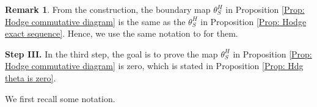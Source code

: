 \documentclass[11pt, a4paper]{amsart}
\theoremstyle{plain}
\theoremstyle{definition}
\newtheorem{remark}[theorem]{Remark}
\numberwithin{equation}{section}
\begin{document}
\begin{remark}
    From the construction, the boundary map $\theta_{S}^{H}$ in Proposition \ref{Prop: Hodge commutative diagram} is the same as the $\theta_{S}^{H}$ in Proposition \ref{Prop: Hodge exact sequence}. Hence, we use the same notation to for them. 
\end{remark}

\vspace{10pt}

\noindent \textbf{Step III.} In the third step, the goal is to prove the map $\theta^{H}_{S}$ in Proposition \ref{Prop: Hodge commutative diagram} is zero, which is stated in Proposition \ref{Prop: Hdg theta is zero}. \\

\par We first recall some notation. 
\end{document}
